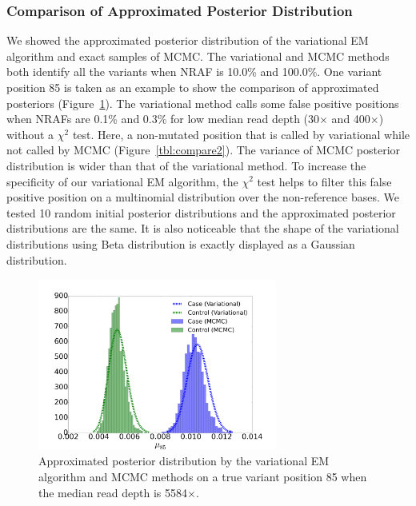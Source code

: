 \documentclass[11pt,reqno]{amsart}
\begin{document}
\subsubsection{Comparison of Approximated Posterior Distribution}
We showed the approximated posterior distribution of the variational EM algorithm and exact samples of MCMC.
The variational and MCMC methods both identify all the variants when NRAF is 10.0\% and 100.0\%.
One variant position 85 is taken as an example to show the comparison of approximated posteriors (Figure~\ref{tbl:compare1}).
The variational method calls some false positive positions when NRAFs are 0.1\% and 0.3\% for low median read depth (30$\times$ and 400$\times$) without a $\chi^2$ test.
Here, a non-mutated position that is called by variational while not called by MCMC (Figure~\ref{tbl:compare2}).
The variance of MCMC posterior distribution is wider than that of the variational method. %
To increase the specificity of our variational EM algorithm, the $\chi^2$ test helps to filter this false positive position on a multinomial distribution over the non-reference bases.
We tested 10 random initial posterior distributions and the approximated posterior distributions are the same.
It is also noticeable that the shape of the variational distributions using Beta distribution is exactly displayed as a Gaussian distribution.
\begin{figure}[htbp]
\centering
\includegraphics[width=0.7\textwidth]{figs/position_85_5584_mcmc_vs_var_mu_fig1.png}
\caption{Approximated posterior distribution by the variational EM algorithm and MCMC methods on a true variant position 85 when the median read depth is 5584$\times$.}
\label{tbl:compare1}
\end{figure}
\end{document}
